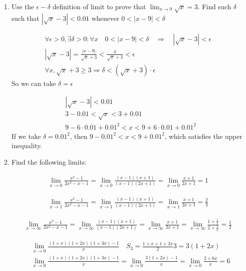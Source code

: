 \documentclass{article}
\begin{document}
\begin{enumerate}
\item Use the $\epsilon-\delta$ definition of limit to prove that $\lim_{x \to 9} \sqrt{x} = 3$. Find such $\delta$ such that $|\sqrt{x} - 3| < 0.01$ whenever $0 < |x - 9| < \delta$

\begin{align*}
\forall \epsilon > 0, \exists \delta > 0: \forall x \quad 0 < |x - 9| < \delta \quad \Rightarrow \quad |\sqrt{x} - 3| < \epsilon\\
|\sqrt{x} - 3| = \frac{|x - 9|}{\sqrt{x} + 3} < \frac{\delta}{\sqrt{x} + 3} < \epsilon\\
\forall x, \sqrt{x} + 3 \geq 3 \Rightarrow \delta < (\sqrt{x} + 3) \cdot \epsilon
\end{align*}
So we can take $\delta = \epsilon$

\begin{align*}
&|\sqrt{x} - 3| < 0.01\\
&3 - 0.01 < \sqrt{x} < 3 + 0.01\\
&9 - 6 \cdot 0.01 + 0.01 ^ 2 < x < 9 + 6 \cdot 0.01 + 0.01 ^ 2
\end{align*}
If we take $\delta = 0.01 ^ 2$, then $9 - 0.01 ^ 2 < x < 9 + 0.01 ^ 2$, which satisfies the upper inequality.

\item Find the following limits:


\begin{align*}
\lim_{x \to 0} \frac{x^2 - 1}{2x^2 - x - 1} = \lim_{x \to 0} \frac{(x - 1)(x + 1)}{(x - 1)(2x + 1)} =  \lim_{x \to 0} \frac{x + 1}{2x + 1} = 1
\end{align*}

\begin{align*}
\lim_{x \to 1} \frac{x^2 - 1}{2x^2 - x - 1} = \lim_{x \to 1} \frac{(x - 1)(x + 1)}{(x - 1)(2x + 1)} =  \lim_{x \to 1} \frac{x + 1}{2x + 1} = \frac{2}{3}
\end{align*}

\begin{align*}
\lim_{x \to \infty} \frac{x^2 - 1}{2x^2 - x - 1} = \lim_{x \to \infty} \frac{(x - 1)(x + 1)}{(x - 1)(2x + 1)} =  \lim_{x \to \infty} \frac{x + 1}{2x + 1} = \lim_{x \to \infty} \frac{1 + \frac{1}{x}}{2 + \frac{1}{x}} = \frac{1}{2}
\end{align*}

\begin{align*}
&\lim_{x \to 0} \frac{(1 + x)(1 + 2x)(1 + 3x) - 1}{x} \quad S_3 = \frac{1 + x + 1 + 3x}{2}3 = 3(1 + 2x)\\
&\lim_{x \to 0} \frac{(1 + x)(1 + 2x)(1 + 3x) - 1}{x} = \lim_{x \to 0} \frac{3(1 + 2x) - 1}{x} = \lim_{x \to 0} \frac{2 + 6x}{x} = 6
\end{align*}


\end{enumerate}
\end{document}
